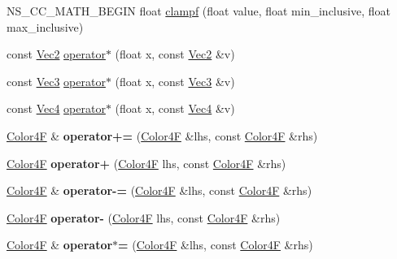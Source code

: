 \begin{DoxyCompactItemize}
\item 
N\+S\+\_\+\+C\+C\+\_\+\+M\+A\+T\+H\+\_\+\+B\+E\+G\+IN float \hyperlink{group__base_ga144f0e8ddc73ae5f846ff7af2b2b1466}{clampf} (float value, float min\+\_\+inclusive, float max\+\_\+inclusive)
\item 
const \hyperlink{classVec2}{Vec2} \hyperlink{group__base_gafc4af4be488f74f130da5c2139d0f835}{operator$\ast$} (float x, const \hyperlink{classVec2}{Vec2} \&v)
\item 
const \hyperlink{classVec3}{Vec3} \hyperlink{group__base_gabe35c8607e1e848d7f3f5b10103bd5e1}{operator$\ast$} (float x, const \hyperlink{classVec3}{Vec3} \&v)
\item 
const \hyperlink{classVec4}{Vec4} \hyperlink{group__base_gac25c78734b1bfed5aa6640a99d959521}{operator$\ast$} (float x, const \hyperlink{classVec4}{Vec4} \&v)
\item 
\mbox{\label{group__base_ga5c01f07f9091a6a8244f7e389c9f3cd2}} 
\hyperlink{structColor4F}{Color4F} \& {\bfseries operator+=} (\hyperlink{structColor4F}{Color4F} \&lhs, const \hyperlink{structColor4F}{Color4F} \&rhs)
\item 
\mbox{\label{group__base_gac7213a43eacb32f94ab438faceb1dd69}} 
\hyperlink{structColor4F}{Color4F} {\bfseries operator+} (\hyperlink{structColor4F}{Color4F} lhs, const \hyperlink{structColor4F}{Color4F} \&rhs)
\item 
\mbox{\label{group__base_ga123e2c982dd49d0c21ee93cc5e0b4f22}} 
\hyperlink{structColor4F}{Color4F} \& {\bfseries operator-\/=} (\hyperlink{structColor4F}{Color4F} \&lhs, const \hyperlink{structColor4F}{Color4F} \&rhs)
\item 
\mbox{\label{group__base_ga5ae53807f0cc7c07b46ca2433ccb25d1}} 
\hyperlink{structColor4F}{Color4F} {\bfseries operator-\/} (\hyperlink{structColor4F}{Color4F} lhs, const \hyperlink{structColor4F}{Color4F} \&rhs)
\item 
\mbox{\label{group__base_ga5e6e3fb3260987f00090a186c962827e}} 
\hyperlink{structColor4F}{Color4F} \& {\bfseries operator$\ast$=} (\hyperlink{structColor4F}{Color4F} \&lhs, const \hyperlink{structColor4F}{Color4F} \&rhs)
\item 
\mbox{\label{group__base_ga0a2c4f8a59d4de0db396f685aefe63d5}} 

\end{DoxyCompactItemize}
